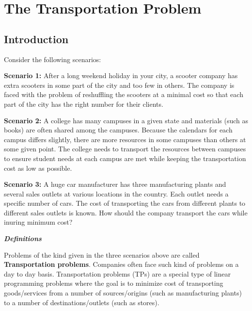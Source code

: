 \documentclass[
  letterpaper,
  DIV=11,
  numbers=noendperiod]{scrreprt}
\begin{document}
\hypertarget{the-transportation-problem}{%
\chapter{The Transportation Problem}\label{the-transportation-problem}}

\hypertarget{introduction-1}{%
\section{Introduction}\label{introduction-1}}

Consider the following scenarios:

\textbf{Scenario 1:} After a long weekend holiday in your city, a
scooter company has extra scooters in some part of the city and too few
in others. The company is faced with the problem of reshuffling the
scooters at a minimal cost so that each part of the city has the right
number for their clients.

\textbf{Scenario 2:} A college has many campuses in a given state and
materials (such as books) are often shared among the campuses. Because
the calendars for each campus differs slightly, there are more resources
in some campuses than others at some given point. The college needs to
transport the resources between campuses to ensure student needs at each
campus are met while keeping the transportation cost as low as possible.

\textbf{Scenario 3:} A huge car manufacturer has three manufacturing
plants and several sales outlets at various locations in the country.
Each outlet needs a specific number of cars. The cost of transporting
the cars from different plants to different sales outlets is known. How
should the company transport the cars while inuring minimum cost?

\textbf{\emph{Definitions}}

Problems of the kind given in the three scenarios above are called
\textbf{Transportation problems}. Companies often face such kind of
problems on a day to day basis. Transportation problems (TPs) are a
special type of linear programming problems where the goal is to
minimize cost of transporting goods/services from a number of
sources/origins (such as manufacturing plants) to a number of
destinations/outlets (such as stores).
\end{document}
